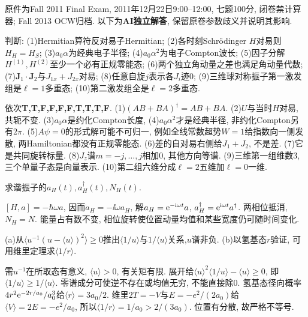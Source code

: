 原件为Fall 2011 Final Exam, 2011年12月22日9:00--12:00, 七题100分, 闭卷禁计算器; Fall 2013 OCW归档. 以下为\textbf{AI独立解答}, 保留原卷参数歧义并说明其影响.
\begin{exercise}
判断: (1)Hermitian算符反对易子Hermitian; (2)各时刻Schrödinger $H$对易则$H_H=H_S$; (3)$a_0\alpha$为经典电子半径; (4)$a_0\alpha^2$为电子Compton波长; (5)因子分解$H^{(1)},H^{(2)}$至少一个必有正规零能态; (6)两个独立角动量之差也满足角动量代数; (7)$\boldsymbol J_1\cdot\boldsymbol J_2$与$J_{1x}+J_{2x}$对易; (8)任意自旋$j$表示各$J_i$迹0; (9)三维球对称振子第一激发组是$\ell=1$多重态; (10)第二激发组全是$\ell=2$多重态.
\end{exercise}
\begin{solution}
依次\textbf{T,T,F,F,F,F,T,T,T,F}. (1)$(AB+BA)^\dagger=AB+BA$. (2)$U$与当时$H$对易, 共轭不变. (3)$a_0\alpha$是约化Compton长度, (4)$a_0\alpha^2$才是经典半径, 非约化Compton另有$2\pi$. (5)$A\psi=0$的形式解可能不可归一, 例如全线常数超势$W=1$给指数向一侧发散, 两Hamiltonian都没有正规零能态. (6)差的自对易右侧给$J_1+J_2$, 不是差. (7)它是共同旋转标量. (8)$J_z$谱$m=-j,\ldots,j$相加0, 其他方向等谱. (9)三维第一组维数3, 三个单量子态是向量表示. (10)第二组六维分成$\ell=2$五维加$\ell=0$一维.
\end{solution}
\begin{exercise}
求谐振子的$a_H(t),a_H^\dagger(t),N_H(t)$.
\end{exercise}
\begin{solution}
$[H,a]=-\hbar\omega a$, 因而$\dot a_H=-\ii\omega a_H$, 解$a_H=\mathrm e^{-\mathrm i\omega t}a$, $a_H^\dagger=\mathrm e^{\mathrm i\omega t}a^\dagger$. 两相位抵消,$N_H=N$. 能量占有数不变, 相位旋转使位置动量均值和某些宽度仍可随时间变化.
\end{solution}
\begin{exercise}
(a)从$\langle u^{-1}(u-\langle u\rangle)^2\rangle\geq0$推出$\langle1/u\rangle$与$1/\langle u\rangle$关系,$u$谱非负. (b)以氢基态$r$验证, 可用维里定理求$\langle1/r\rangle$.
\end{exercise}
\begin{solution}
需$u^{-1}$在所取态有意义, $\langle u\rangle>0$, 有关矩有限. 展开给$\langle u\rangle^2\langle1/u\rangle-\langle u\rangle\geq0$, 即$\langle1/u\rangle\geq1/\langle u\rangle$. 零谱成分可使逆不存在或均值无穷, 不能直接除0. 氢基态径向概率$4r^2\mathrm e^{-2r/a_0}/a_0^3$给$\langle r\rangle=3a_0/2$. 维里$2T=-V$与$E=-e^2/(2a_0)$给$\langle V\rangle=2E=-e^2/a_0$, 所以$\langle1/r\rangle=1/a_0>2/(3a_0)$. 位置有分散, 故严格不等号.
\end{solution}
